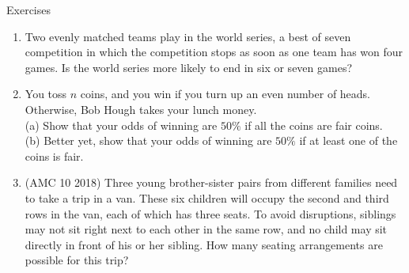 \begin{xcb}{Exercises}
\begin{enumerate}
\begin{hint}
\end{hint}
\item {} Two evenly matched teams play in the world series, a best of seven competition in which the competition stops as soon as one team has won four games. Is the world series more likely to end in six or seven games?
\item You toss $n$ coins, and you win if you turn up an even number of heads. Otherwise, Bob Hough takes your lunch money.\\
(a)  Show that your odds of winning are $50\%$ if all the coins are fair coins.\\
(b)  Better yet, show that your odds of winning are $50\%$ if at least one of the coins is
fair.\\
\item(AMC 10 2018)  Three young brother-sister pairs from different families need to take a trip in a van. These six children will occupy the second and third rows in the van, each of which has three seats. To avoid disruptions, siblings may not sit right next to each other in the same row, and no child may sit directly in front of his or her sibling. How many seating arrangements are possible for this trip?
\end{enumerate}
\end{xcb}
